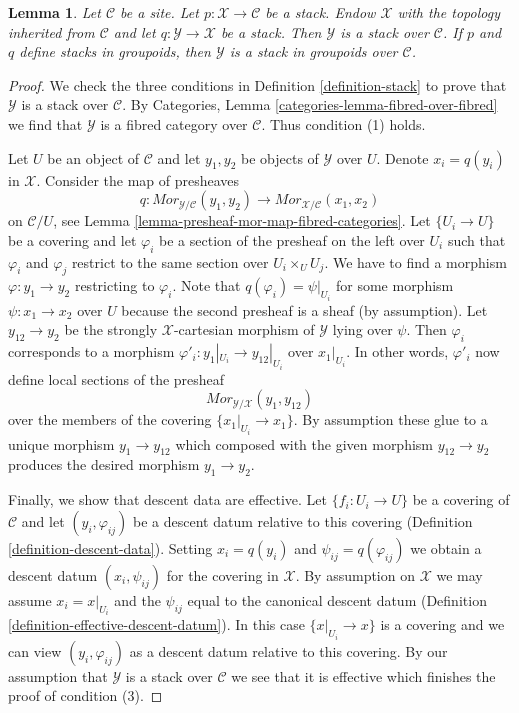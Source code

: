 \documentclass{stacks-project}
\theoremstyle{plain}
\newtheorem{lemma}[subsection]{Lemma}
\theoremstyle{definition}
\theoremstyle{remark}
\numberwithin{equation}{subsection}
\begin{document}
\begin{lemma}
\label{lemma-stack-over-stack}
Let $\mathcal{C}$ be a site. Let $p : \mathcal{X} \to \mathcal{C}$
be a stack. Endow $\mathcal{X}$ with the topology inherited from
$\mathcal{C}$ and let $q : \mathcal{Y} \to \mathcal{X}$ be a stack.
Then $\mathcal{Y}$ is a stack over $\mathcal{C}$.
If $p$ and $q$ define stacks in groupoids, then
$\mathcal{Y}$ is a stack in groupoids over $\mathcal{C}$.
\end{lemma}

\begin{proof}
We check the three conditions in Definition \ref{definition-stack}
to prove that $\mathcal{Y}$ is a stack over $\mathcal{C}$.
By Categories, Lemma \ref{categories-lemma-fibred-over-fibred}
we find that $\mathcal{Y}$ is a fibred category over $\mathcal{C}$.
Thus condition (1) holds.

\medskip\noindent
Let $U$ be an object of $\mathcal{C}$ and let $y_1, y_2$ be objects
of $\mathcal{Y}$ over $U$. Denote $x_i = q(y_i)$ in $\mathcal{X}$.
Consider the map of presheaves
$$
q : \mathit{Mor}_{\mathcal{Y}/\mathcal{C}}(y_1, y_2)
\longrightarrow
\mathit{Mor}_{\mathcal{X}/\mathcal{C}}(x_1, x_2)
$$
on $\mathcal{C}/U$, see Lemma \ref{lemma-presheaf-mor-map-fibred-categories}.
Let $\{U_i \to U\}$ be a covering and let $\varphi_i$ be a section
of the presheaf on the left over $U_i$ such that $\varphi_i$ and
$\varphi_j$ restrict to the same section over $U_i \times_U U_j$.
We have to find a morphism $\varphi : y_1 \to y_2$ restricting to $\varphi_i$.
Note that $q(\varphi_i) = \psi|_{U_i}$ for some morphism
$\psi : x_1 \to x_2$ over $U$ because the second presheaf is a sheaf
(by assumption). Let $y_{12} \to y_2$ be the strongly $\mathcal{X}$-cartesian
morphism of $\mathcal{Y}$ lying over $\psi$. Then $\varphi_i$ corresponds
to a morphism $\varphi'_i : y_1|_{U_i} \to y_{12}|_{U_i}$ over $x_1|_{U_i}$.
In other words, $\varphi'_i$ now define local sections of the presheaf
$$
\mathit{Mor}_{\mathcal{Y}/\mathcal{X}}(y_1, y_{12})
$$
over the members of the covering $\{x_1|_{U_i} \to x_1\}$. By assumption these
glue to a unique morphism $y_1 \to y_{12}$ which composed with the given
morphism $y_{12} \to y_2$ produces the desired morphism $y_1 \to y_2$.

\medskip\noindent
Finally, we show that descent data are effective. Let $\{f_i : U_i \to U\}$
be a covering of $\mathcal{C}$ and let $(y_i, \varphi_{ij})$ be a descent
datum relative to this covering (Definition \ref{definition-descent-data}).
Setting $x_i = q(y_i)$ and $\psi_{ij} = q(\varphi_{ij})$
we obtain a descent datum $(x_i, \psi_{ij})$ for the covering in $\mathcal{X}$.
By assumption on $\mathcal{X}$ we may assume $x_i = x|_{U_i}$
and the $\psi_{ij}$ equal to the canonical descent datum
(Definition \ref{definition-effective-descent-datum}).
In this case $\{x|_{U_i} \to x\}$ is a covering and we can view
$(y_i, \varphi_{ij})$ as a descent datum relative to this covering.
By our assumption that $\mathcal{Y}$ is a stack over $\mathcal{C}$
we see that it is effective which finishes the proof of condition (3).


\end{proof}
\end{document}
